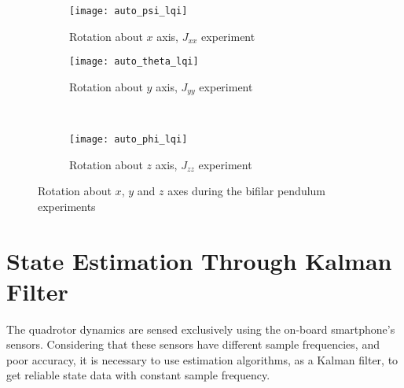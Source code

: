 \begin{figure}[H]
\begin{subfigure}{.5\linewidth}
\centering
\texttt{[image: auto\_psi\_lqi]}
\caption{Rotation about $x$ axis, $J_{xx}$ experiment}
\label{fig:auto_psi_lqi}
\end{subfigure}%
\begin{subfigure}{.5\linewidth}
\centering
\texttt{[image: auto\_theta\_lqi]}
\caption{Rotation about $y$ axis, $J_{yy}$ experiment}
\label{fig:auto_theta_lqi}
\end{subfigure}\\[1ex]
\begin{subfigure}{\linewidth}
\centering
\texttt{[image: auto\_phi\_lqi]}
\caption{Rotation about $z$ axis, $J_{zz}$ experiment}
\label{fig:auto_psi_lqi}
\end{subfigure}
\caption{Rotation about $x$, $y$ and $z$ axes during the bifilar pendulum experiments}
\label{fig:auto_lqi}
\end{figure}

\section{State Estimation Through Kalman Filter}
\label{sec:stateestimation}
The quadrotor dynamics are sensed exclusively using the on-board smartphone's sensors. Considering that these sensors have different sample frequencies, and poor accuracy, it is necessary to use estimation algorithms, as a Kalman filter, to get reliable state data with constant sample frequency.

